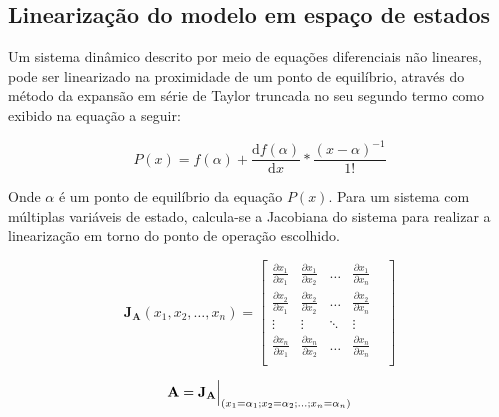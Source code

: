 \documentclass[a4paper]{ifacconf}
\begin{document}
        \subsection{Linearização do modelo em espaço de estados}
    
    Um sistema dinâmico descrito por meio de equações diferenciais não lineares, pode ser linearizado na proximidade de um ponto de equilíbrio, através do método da expansão em série de Taylor truncada no seu segundo termo como exibido na equação a seguir:
    
    \begin{equation}
        P(x) = f(\alpha) + \dfrac{\mathrm{d}f(\alpha)}{\mathrm{d}x}*\frac{(x-\alpha)^{-1}}{1!}    
    \end{equation}
    
    Onde $\alpha$ é um ponto de equilíbrio da equação $P(x)$.  
    Para um sistema com múltiplas variáveis de estado, calcula-se a Jacobiana do sistema para realizar a linearização em torno do ponto de operação escolhido.  
    
    \begin{equation} \label{eq:Jacobian_A}
    \mathbf{J_A}(x_1,x_2,\dots,x_n) =
        \begin{bmatrix}
            \frac{\partial x_1}{\partial x_1} & 
            \frac{\partial x_1}{\partial x_2} & 
            \dots &
            \frac{\partial x_1}{\partial x_n} &\\[1ex]
            \frac{\partial x_2}{\partial x_1} & 
            \frac{\partial x_2}{\partial x_2} & 
            \dots &
            \frac{\partial x_2}{\partial x_n} &\\[1ex]
            \vdots & 
            \vdots & 
            \ddots &
            \vdots &\\[1ex]
            \frac{\partial x_n}{\partial x_1} & 
            \frac{\partial x_n}{\partial x_2} & 
            \dots &
            \frac{\partial x_n}{\partial x_n} &\\[1ex]
    \end{bmatrix}
    \end{equation}
    
    \begin{equation} \label{eq:eval_A}
        \mathbf{A=J_A} \Bigr\rvert_{(x_1=\alpha_1;x_2=\alpha_2;\dots;x_n=\alpha_n)} \\
    \end{equation}
    
\end{document}
